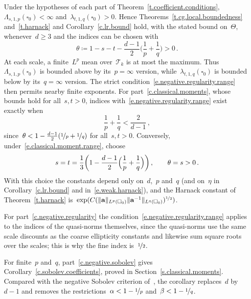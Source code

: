 \documentclass[11pt,letterpaper]{article}
\numberwithin{equation}{section}
\theoremstyle{definition}
\renewcommand{\a}{\mathbf{a}}
\newcommand{\nf}{\nicefrac}
\newcommand{\cu}{\square}
\DeclarePairedDelimiter{\norm}{\lVert}{\rVert}
\begin{document}
Under the hypotheses of each part of Theorem~\ref{t.coefficient.conditions},~$\Lambda_{s,1,p}(\cu_0)<\infty$ and~$\lambda_{t,1,q}(\cu_0)>0$. Hence Theorems~\ref{t.cg.local.boundedness} and~\ref{t.harnack} and Corollary~\ref{c.lr.bound} hold, with the stated bound on~$\Theta$, whenever~$d\geq3$ and the indices can be chosen with
\begin{equation}
	\theta\coloneqq1-s-t-\frac{d-1}{2}\biggl(\frac1p+\frac1q\biggr)>0\,.
	\label{e.negative.regularity.range}
\end{equation}
At each scale, a finite~$L^p$ mean over~$\mathscr T_k$ is at most the maximum. Thus~$\Lambda_{s,1,p}(\cu_0)$ is bounded above by its~$p=\infty$ version, while~$\lambda_{t,1,q}(\cu_0)$ is bounded below by its~$q=\infty$ version. The strict condition~\eqref{e.negative.regularity.range} then permits nearby finite exponents. For part~\ref{c.classical.moments}, whose bounds hold for all~$s,t>0$, indices with~\eqref{e.negative.regularity.range} exist exactly when
\begin{equation}
	\frac1p+\frac1q<\frac{2}{d-1}\,,
	\label{e.classical.moment.range}
\end{equation}
since~$\theta<1-\frac{d-1}2(\nf1p+\nf1q)$ for all~$s,t>0$. Conversely, under~\eqref{e.classical.moment.range}, choose
\begin{equation*}
	s=t=\frac13\biggl(1-\frac{d-1}2\Bigl(\frac1p+\frac1q\Bigr)\biggr)\,,\qquad \theta=s>0\,.
\end{equation*}
With this choice the constants depend only on~$d$,~$p$ and~$q$ (and on~$\eta$ in Corollary~\ref{c.lr.bound} and in~\eqref{e.weak.harnack}), and the Harnack constant of Theorem~\ref{t.harnack} is~$\exp(C(\norm{\a}_{L^p(\cu_0)}\norm{\a^{-1}}_{L^q(\cu_0)})^{\nf12})$.

\smallskip

For part~\ref{c.negative.regularity} the condition~\eqref{e.negative.regularity.range} applies to the indices of the quasi-norms themselves, since the quasi-norms use the same scale discounts as the coarse ellipticity constants and likewise sum square roots over the scales; this is why the fine index is~$\nf12$.

\smallskip

For finite~$p$ and~$q$, part~\ref{c.negative.sobolev} gives Corollary~\ref{c.sobolev.coefficients}, proved in Section~\ref{s.classical.moments}. Compared with the negative Sobolev criterion of~\cite{AADKM}, the corollary replaces~$d$ by~$d-1$ and removes the restrictions~$\alpha<1-\nf1p$ and~$\beta<1-\nf1q$.
\end{document}
